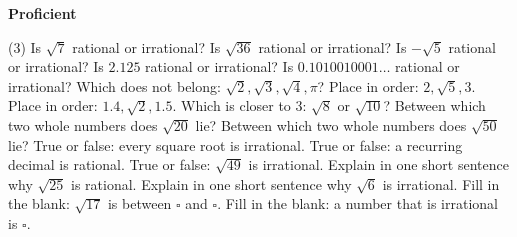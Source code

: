 \documentclass[17pt,a4paper,landscape]{extarticle}
\begin{document}
\sffamily
\boldmath

\boldmath

{\LARGE \textbf{Proficient}}
\begin{tasks}(3)
\task Is \mbox{$\sqrt{7}$} rational or irrational?
\task Is \mbox{$\sqrt{36}$} rational or irrational?
\task Is \mbox{$-\sqrt{5}$} rational or irrational?
\task Is \mbox{$2.125$} rational or irrational?
\task Is \mbox{$0.1010010001\ldots$} rational or irrational?
\task Which does not belong: \mbox{$\sqrt{2}, \sqrt{3}, \sqrt{4}, \pi$}?
\task Place in order: \mbox{$2, \sqrt{5}, 3$}.
\task Place in order: \mbox{$1.4, \sqrt{2}, 1.5$}.
\task Which is closer to \mbox{$3$}: \mbox{$\sqrt{8}$} or \mbox{$\sqrt{10}$}?
\task Between which two whole numbers does \mbox{$\sqrt{20}$} lie?
\task Between which two whole numbers does \mbox{$\sqrt{50}$} lie?
\task True or false: every square root is irrational.
\task True or false: a recurring decimal is rational.
\task True or false: \mbox{$\sqrt{49}$} is irrational.
\task Explain in one short sentence why \mbox{$\sqrt{25}$} is rational.
\task Explain in one short sentence why \mbox{$\sqrt{6}$} is irrational.
\task Fill in the blank: \mbox{$\sqrt{17}$} is between \mbox{$\square$} and \mbox{$\square$}.
\task Fill in the blank: a number that is irrational is \mbox{$\square$}.
\end{tasks}
\end{document}
